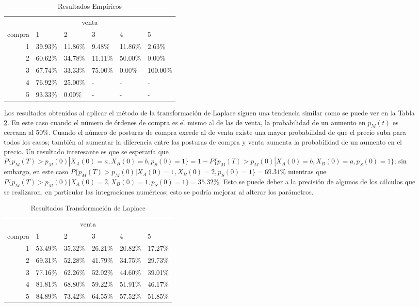 \documentclass[11pt]{article}
\numberwithin{equation}{section} %
\begin{document}
\begin{table}[htbp]
\centering
\caption{Resultados Empíricos}
\begin{tabular}{r|p{1.5cm}|p{1.5cm}|p{1.5cm}|p{1.5cm}|p{1.5cm}|}
\multicolumn{6}{c}{venta}\\
\cline{2-6}
compra & 1& 2 & 3 & 4 & 5 \\
\cline{2-6}
1 & 39.93\% & 11.86\% & 9.48\% & 11.86\% & 2.63\% \\
2 & 60.62\% & 34.78\% & 11.11\% & 50.00\% & 0.00\% \\
3 & 67.74\% & 33.33\% & 75.00\% & 0.00\% & 100.00\% \\
4 & 76.92\% & 25.00\% & - & - & - \\
5 & 93.33\% & 0.00\% & - & - & - \\
\cline{2-6}
\end{tabular}%
\label{tab:resempirca}%
\end{table}%

Los resultados obtenidos al aplicar el método de la transformación de Laplace siguen una tendencia similar como se puede ver en la Tabla \ref{tab:reslaplace}. En este caso cuando el número de órdenes de compra es el mismo al de las de venta, la probabilidad de un aumento en $p_M(t)$ es cercana al 50\%. Cuando el número de posturas de compra excede al de venta existe una mayor probabilidad de que el precio suba para todos los casos; también al aumentar la diferencia entre las posturas de compra y venta aumenta la probabilidad de un aumento en el precio. Un resultado interesante es que se esperaría que $P\{p_M(T)>p_M(0)|X_A(0)=a,X_B(0)=b,p_S(0)=1\}=1-P\{p_M(T)>p_M(0)|X_A(0)=b,X_B(0)=a,p_S(0)=1\}$; sin embargo, en este caso $P\{p_M(T)>p_M(0)|X_A(0)=1,X_B(0)=2,p_S(0)=1\}=69.31\%$ mientras que $P\{p_M(T)>p_M(0)|X_A(0)=2,X_B(0)=1,p_S(0)=1\}=35.32\%$. Esto se puede deber a la precisión de algunos de los cálculos que se realizaron, en particular las integraciones numéricas; esto se podría mejorar al alterar los parámetros.

\begin{table}[htbp]
\centering
\caption{Resultados Transformación de Laplace}
\begin{tabular}{r|p{1.5cm}|p{1.5cm}|p{1.5cm}|p{1.5cm}|p{1.5cm}|}
\multicolumn{6}{c}{venta}\\
\cline{2-6}
compra & 1& 2 & 3 & 4 & 5 \\
\cline{2-6}
1 & 53.49\% & 35.32\% & 26.21\% & 20.82\% & 17.27\% \\
2 & 69.31\% & 52.28\% & 41.79\% & 34.75\% & 29.73\% \\
3 & 77.16\% & 62.26\% & 52.02\% & 44.60\% & 39.01\% \\
4 & 81.81\% & 68.80\% & 59.22\% & 51.91\% & 46.17\% \\
5 & 84.89\% & 73.42\% & 64.55\% & 57.52\% & 51.85\% \\
\cline{2-6}
\end{tabular}%
\label{tab:reslaplace}%
\end{table}%
\end{document}
